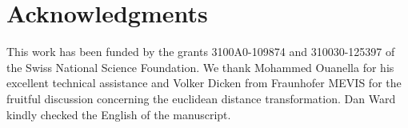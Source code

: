 \section{Acknowledgments}
This work has been funded by the grants 3100A0-109874 and 310030-125397 of the Swiss National Science Foundation. We thank Mohammed Ouanella for his excellent technical assistance and Volker Dicken from Fraunhofer MEVIS for the fruitful discussion concerning the euclidean distance transformation. Dan Ward kindly checked the English of the manuscript.
%
%